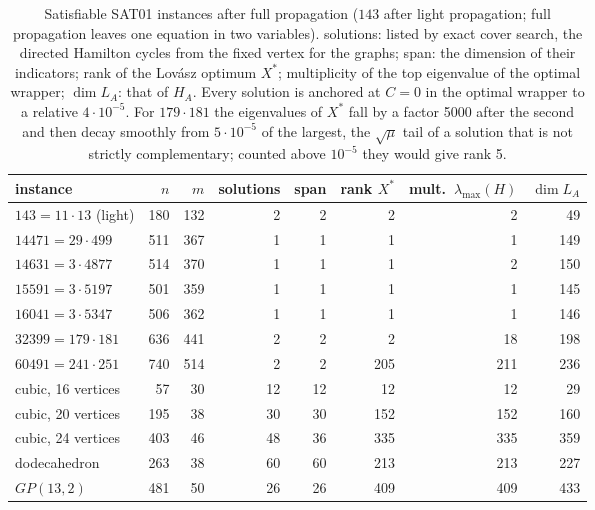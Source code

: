 \documentclass[11pt]{article}
\theoremstyle{definition}
\theoremstyle{remark}
\newcommand{\lmax}{\lambda_{\max}}
\begin{document}
\begin{table}[ht]
\begin{center}
\small
\begin{tabular}{|l|r|r|r|r|r|r|r|}
\hline
instance & $n$ & $m$ & solutions & span & rank $X^*$ & mult.\ $\lmax(H)$ & $\dim L_A$ \\
\hline
$143=11\cdot13$ (light) & 180 & 132 & 2  & 2  & 2   & 2   & 49 \\
$14471=29\cdot499$      & 511 & 367 & 1  & 1  & 1   & 1   & 149 \\
$14631=3\cdot4877$      & 514 & 370 & 1  & 1  & 1   & 2   & 150 \\
$15591=3\cdot5197$      & 501 & 359 & 1  & 1  & 1   & 1   & 145 \\
$16041=3\cdot5347$      & 506 & 362 & 1  & 1  & 1   & 1   & 146 \\
$32399=179\cdot181$     & 636 & 441 & 2  & 2  & 2   & 18  & 198 \\
$60491=241\cdot251$     & 740 & 514 & 2  & 2  & 205 & 211 & 236 \\
\hline
cubic, 16 vertices      & 57  & 30  & 12 & 12 & 12  & 12  & 29 \\
cubic, 20 vertices      & 195 & 38  & 30 & 30 & 152 & 152 & 160 \\
cubic, 24 vertices      & 403 & 46  & 48 & 36 & 335 & 335 & 359 \\
dodecahedron            & 263 & 38  & 60 & 60 & 213 & 213 & 227 \\
$GP(13,2)$              & 481 & 50  & 26 & 26 & 409 & 409 & 433 \\
\hline
\end{tabular}
\end{center}
\caption{\label{tab:sat01sat} Satisfiable SAT01 instances after full
propagation ($143$ after light propagation; full propagation leaves one
equation in two variables). solutions: listed by exact cover search, the
directed Hamilton cycles from the fixed vertex for the graphs; span: the
dimension of their indicators; rank of the Lov\'asz optimum $X^*$;
multiplicity of the top eigenvalue of the optimal wrapper; $\dim L_A$: that of
$H_A$. Every solution is anchored at $C=0$ in the optimal wrapper to a
relative $4\cdot10^{-5}$. For $179\cdot181$ the eigenvalues of $X^*$ fall by a
factor 5000 after the second and then decay smoothly from $5\cdot10^{-5}$ of the
largest, the $\sqrt\mu$ tail of a solution that is not strictly
complementary; counted above $10^{-5}$ they would give rank 5.}
\end{table}
\end{document}
